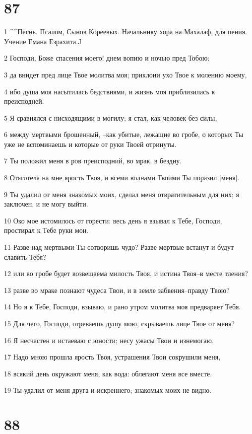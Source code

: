\chapter{87}

\par 1 ^^Песнь. Псалом, Сынов Кореевых. Начальнику хора на Махалаф, для пения. Учение Емана Езрахита.^^
\par 2 Господи, Боже спасения моего! днем вопию и ночью пред Тобою:
\par 3 да внидет пред лице Твое молитва моя; приклони ухо Твое к молению моему,
\par 4 ибо душа моя насытилась бедствиями, и жизнь моя приблизилась к преисподней.
\par 5 Я сравнялся с нисходящими в могилу; я стал, как человек без силы,
\par 6 между мертвыми брошенный, --как убитые, лежащие во гробе, о которых Ты уже не вспоминаешь и которые от руки Твоей отринуты.
\par 7 Ты положил меня в ров преисподний, во мрак, в бездну.
\par 8 Отяготела на мне ярость Твоя, и всеми волнами Твоими Ты поразил [меня].
\par 9 Ты удалил от меня знакомых моих, сделал меня отвратительным для них; я заключен, и не могу выйти.
\par 10 Око мое истомилось от горести: весь день я взывал к Тебе, Господи, простирал к Тебе руки мои.
\par 11 Разве над мертвыми Ты сотворишь чудо? Разве мертвые встанут и будут славить Тебя?
\par 12 или во гробе будет возвещаема милость Твоя, и истина Твоя--в месте тления?
\par 13 разве во мраке познают чудеса Твои, и в земле забвения--правду Твою?
\par 14 Но я к Тебе, Господи, взываю, и рано утром молитва моя предваряет Тебя.
\par 15 Для чего, Господи, отреваешь душу мою, скрываешь лице Твое от меня?
\par 16 Я несчастен и истаеваю с юности; несу ужасы Твои и изнемогаю.
\par 17 Надо мною прошла ярость Твоя, устрашения Твои сокрушили меня,
\par 18 всякий день окружают меня, как вода: облегают меня все вместе.
\par 19 Ты удалил от меня друга и искреннего; знакомых моих не видно.

\chapter{88}

